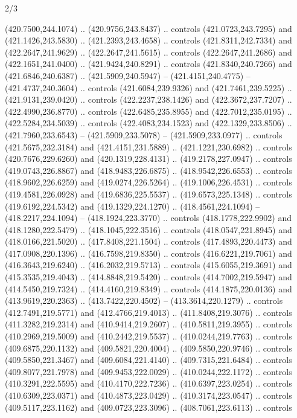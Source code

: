 \begin{flagdescription}{2/3}
\begin{scope}[xshift=0.5\flaglength,yshift=0.5\flagwidth,scale=\flagwidth/495.65]
\begin{scope}[y=0.8pt, x=0.8pt, yscale=-1,shift={(-463.76,-309.78)}]
  (420.7500,244.1074) .. (420.9756,243.8437) .. controls (421.0723,243.7295) and
  (421.1426,243.5830) .. (421.2393,243.4658) .. controls (421.8311,242.7334) and
  (422.2647,241.9629) .. (422.2647,241.5615) .. controls (422.2647,241.2686) and
  (422.1651,241.0400) .. (421.9424,240.8291) .. controls (421.8340,240.7266) and
  (421.6846,240.6387) .. (421.5909,240.5947) -- (421.4151,240.4775) --
  (421.4737,240.3604) .. controls (421.6084,239.9326) and (421.7461,239.5225) ..
  (421.9131,239.0420) .. controls (422.2237,238.1426) and (422.3672,237.7207) ..
  (422.4990,236.8770) .. controls (422.6485,235.8955) and (422.7012,235.0195) ..
  (422.5284,234.5039) .. controls (422.4083,234.1523) and (422.1329,233.8506) ..
  (421.7960,233.6543) -- (421.5909,233.5078) -- (421.5909,233.0977) .. controls
  (421.5675,232.3184) and (421.4151,231.5889) .. (421.1221,230.6982) .. controls
  (420.7676,229.6260) and (420.1319,228.4131) .. (419.2178,227.0947) .. controls
  (419.0743,226.8867) and (418.9483,226.6875) .. (418.9542,226.6553) .. controls
  (418.9602,226.6259) and (419.0274,226.5264) .. (419.1006,226.4531) .. controls
  (419.4581,226.0928) and (419.6836,225.5537) .. (419.6573,225.1348) .. controls
  (419.6192,224.5342) and (419.1329,224.1270) .. (418.4561,224.1094) --
  (418.2217,224.1094) -- (418.1924,223.3770) .. controls (418.1778,222.9902) and
  (418.1280,222.5479) .. (418.1045,222.3516) .. controls (418.0547,221.8945) and
  (418.0166,221.5020) .. (417.8408,221.1504) .. controls (417.4893,220.4473) and
  (417.0908,220.1396) .. (416.7598,219.8350) .. controls (416.6221,219.7061) and
  (416.3643,219.6240) .. (416.2032,219.5713) .. controls (415.6055,219.3691) and
  (415.3535,219.4043) .. (414.8848,219.5420) .. controls (414.7002,219.5947) and
  (414.5450,219.7324) .. (414.4160,219.8349) .. controls (414.1875,220.0136) and
  (413.9619,220.2363) .. (413.7422,220.4502) -- (413.3614,220.1279) .. controls
  (412.7491,219.5771) and (412.4766,219.4013) .. (411.8408,219.3076) .. controls
  (411.3282,219.2314) and (410.9414,219.2607) .. (410.5811,219.3955) .. controls
  (410.2969,219.5009) and (410.2442,219.5537) .. (410.0244,219.7763) .. controls
  (409.6875,220.1132) and (409.5821,220.4004) .. (409.5850,220.9746) .. controls
  (409.5850,221.3467) and (409.6084,221.4140) .. (409.7315,221.6484) .. controls
  (409.8077,221.7978) and (409.9453,222.0029) .. (410.0244,222.1172) .. controls
  (410.3291,222.5595) and (410.4170,222.7236) .. (410.6397,223.0254) .. controls
  (410.6309,223.0371) and (410.4873,223.0429) .. (410.3174,223.0547) .. controls
  (409.5117,223.1162) and (409.0723,223.3096) .. (408.7061,223.6113) .. controls

\end{scope}
\end{scope}
\end{flagdescription}
